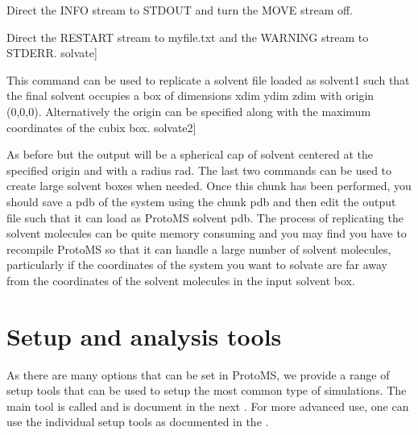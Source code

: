 \documentclass[letterpaper,10pt,english]{sphinxmanual}
\begin{document}
Direct the INFO stream to STDOUT and turn the MOVE stream off.

%
\begin{sphinxVerbatim}[commandchars=\\\{\}]
  
\end{sphinxVerbatim}

Direct the RESTART stream to myfile.txt and the WARNING stream to STDERR. solvate{]}

\ignorespaces 
\def\sphinxLiteralBlockLabel{\label{\detokenize{protoms:index-91}}}
%
\begin{sphinxVerbatim}[commandchars=\\\{\}]
      \PYG{p}{[}     \PYG{p}{]}
\end{sphinxVerbatim}

This command can be used to replicate a solvent file loaded as solvent1 such that the final solvent occupies a box of dimensions xdim ydim zdim with origin (0,0,0). Alternatively the origin can be specified along with the maximum coordinates of the cubix box. solvate2{]}

%
\begin{sphinxVerbatim}[commandchars=\\\{\}]
      
\end{sphinxVerbatim}

As before but the output will be a spherical cap of solvent centered at the specified origin and with a radius rad. The last two commands can be used to create large solvent boxes when needed. Once this chunk has been performed, you should save a pdb of the system using the chunk pdb and then edit the output file such that it can load as ProtoMS solvent pdb. The process of replicating the solvent molecules can be quite memory consuming and you may find you have to recompile ProtoMS so that it can handle a large number of solvent molecules, particularly if the coordinates of the system you want to solvate are far away from the coordinates of the solvent molecules in the input solvent box.


\section{Setup and analysis tools}
\label{\detokenize{protoms:setup-and-analysis-tools}}
As there are many options that can be set in ProtoMS, we provide a range of setup tools that can be used to setup the most common type of simulations. The main tool is called  and is document in the next . For more advanced use, one can use the individual setup tools as documented in the .
\end{document}
